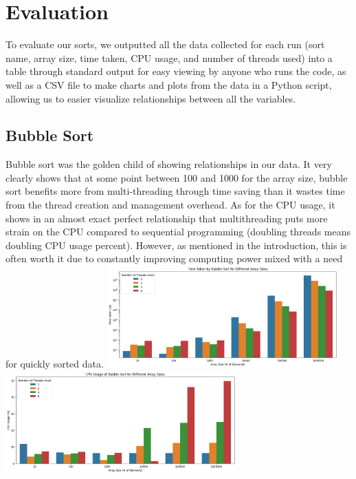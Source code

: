 \documentclass[conference]{IEEEtran}
\begin{document}
\section{Evaluation}
To evaluate our sorts, we outputted all the data collected for each run (sort name, array size, time taken, CPU usage, and number of threads used) into a table through standard output for easy viewing by anyone who runs the code, as well as a CSV file to make charts and plots from the data in a Python script, allowing us to easier visualize relationships between all the variables.

\subsection{Bubble Sort}
Bubble sort was the golden child of showing relationships in our data. It very clearly shows that at some point between 100 and 1000 for the array size, bubble sort benefits more from multi-threading through time saving than it wastes time from the thread creation and management overhead.
As for the CPU usage, it shows in an almost exact perfect relationship that multithreading puts more strain on the CPU compared to sequential programming (doubling threads means doubling CPU usage percent). However, as mentioned in the introduction, this is often worth it due to constantly improving computing power mixed with a need for quickly sorted data.
\includegraphics[width=3.5in]{BubbleSortTimeTaken.png}
\includegraphics[width=3.5in]{BubbleSortCPUUsage.png}
\end{document}
